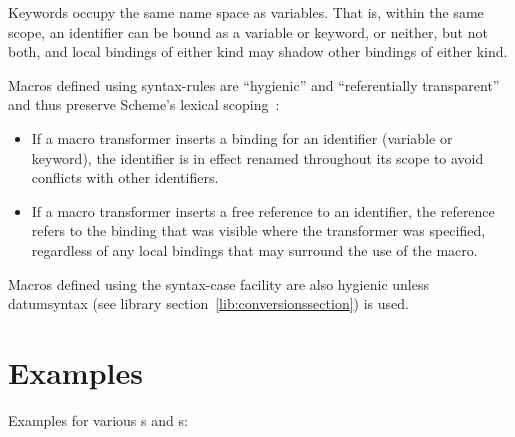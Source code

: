 Keywords occupy the same name space as variables.
That is, within the same
scope, an identifier can be bound as a variable or keyword, or neither, but
not both, and local bindings of either kind may shadow other bindings of
either kind.

Macros defined using {\cf syntax-rules} are ``hygienic'' and ``referentially
transparent'' and thus preserve Scheme's lexical scoping~\cite{Kohlbecker86,
hygienic,Bawden88,macrosthatwork,syntacticabstraction}:

\begin{itemize}
\item If a macro transformer inserts a binding for an identifier
(variable or keyword), the identifier is in effect renamed
throughout its scope to avoid conflicts with other identifiers.

\item If a macro transformer inserts a free reference to an
identifier, the reference refers to the binding that was visible
where the transformer was specified, regardless of any local
bindings that may surround the use of the macro.
\end{itemize}

Macros defined using the {\cf syntax-case} facility are also
hygienic unless {\cf datum\coerce{}syntax}
(see library section~\ref{lib:conversionssection}) is used.

\section{Examples}

Examples for various s and s:


